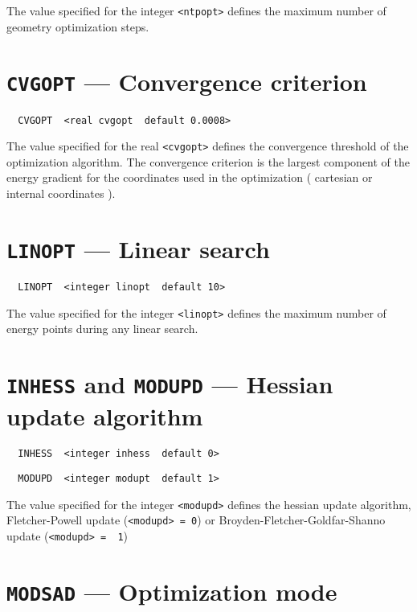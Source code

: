 The value specified for the integer \verb+<ntpopt>+ defines the maximum 
number of geometry optimization steps.  

\section{{\tt CVGOPT} --- Convergence criterion}

\begin{verbatim}
  CVGOPT  <real cvgopt  default 0.0008>
\end{verbatim}
 
The value specified for the real \verb+<cvgopt>+ defines the convergence
threshold of the optimization algorithm. The convergence criterion is
the largest component of the energy gradient for the coordinates used
in the optimization ( cartesian or internal coordinates ).

\section{{\tt LINOPT} --- Linear search}

\begin{verbatim}
  LINOPT  <integer linopt  default 10>
\end{verbatim}

The value specified for the integer \verb+<linopt>+ defines the maximum 
number of energy points during any linear search. 

\section{{\tt INHESS} and {\tt MODUPD} --- Hessian update algorithm}

\begin{verbatim}
  INHESS  <integer inhess  default 0>
\end{verbatim}

\begin{verbatim}
  MODUPD  <integer modupt  default 1>
\end{verbatim}

The value specified for the integer \verb+<modupd>+ defines the hessian 
update algorithm, Fletcher-Powell update (\verb+<modupd> = 0+) or
Broyden-Fletcher-Goldfar-Shanno update (\verb+<modupd> =  1+)

\section{{\tt MODSAD} --- Optimization mode}

